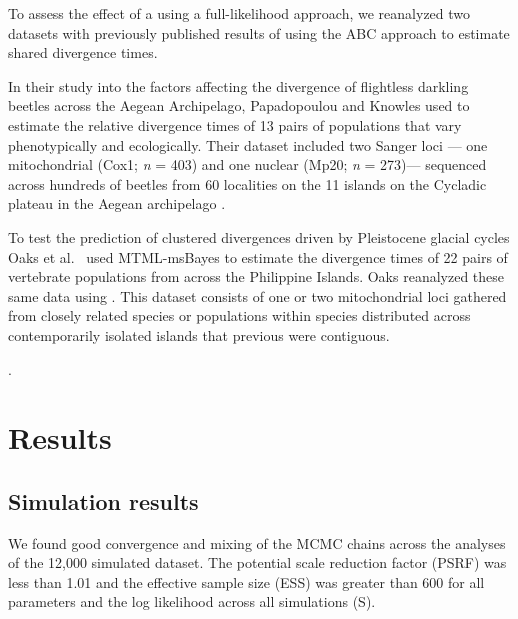 \documentclass[letterpaper,12pt]{article}
\begin{document}
To assess the effect of a using a full-likelihood approach, we reanalyzed two
datasets with previously published results of using the ABC approach to
estimate shared divergence times.

In their study into the factors affecting the divergence of flightless darkling beetles across the Aegean Archipelago,
Papadopoulou and Knowles \citeyear{PapadopoulouKnowles2015} used \dppmsbayes to estimate the relative divergence times of 13 pairs of populations that vary phenotypically and ecologically.
Their dataset included two Sanger loci --- one mitochondrial (Cox1; \textit{n} = 403) and one nuclear (Mp20; \textit{n} = 273)--- sequenced across hundreds of beetles from 60 localities on the 11 islands on the Cycladic plateau in the Aegean archipelago \citep{PapadopoulouKnowles2015}.

To test the prediction of clustered divergences driven by Pleistocene glacial
cycles Oaks et al.\ \citeyear{Oaks2012} used MTML-msBayes \citep{Huang2011} to
estimate the divergence times of 22 pairs of vertebrate populations from across the
Philippine Islands.
Oaks \citeyear{Oaks2014dpp} reanalyzed these same data using \dppmsbayes.
This dataset consists of one or two mitochondrial loci gathered from closely related species or populations within species distributed across contemporarily isolated islands that previous were contiguous.

.


\section{Results}

\subsection{Simulation results}

We found good convergence and mixing of the MCMC chains across the \ecoevolity
analyses of the 12,000 simulated dataset.
The potential scale reduction factor (PSRF) was less than 1.01 and the
effective sample size (ESS) was greater than 600 for all parameters and the log
likelihood across all simulations
(\figs S).
\end{document}
